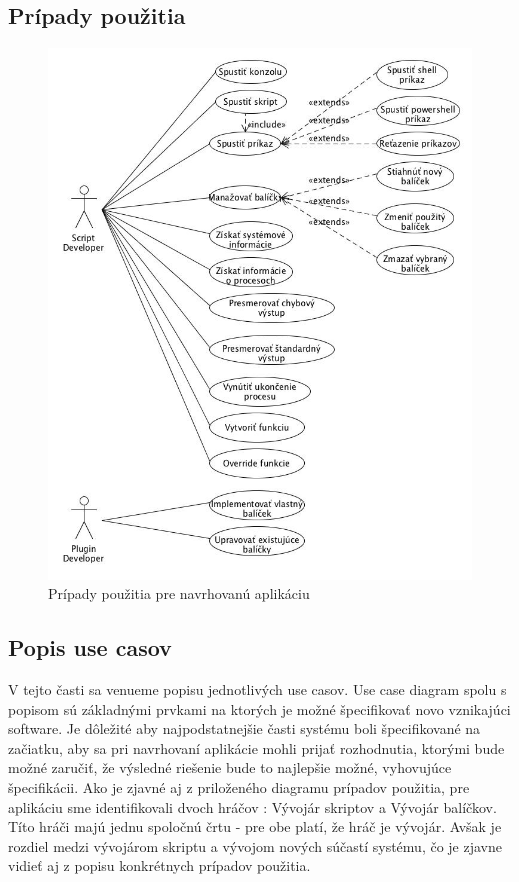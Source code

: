 \subsection{Prípady použitia}
\begin{figure}[!htbp]
	\centering
	\includegraphics[scale=0.6]{img/usecase.jpg}
	\caption{Prípady použitia pre navrhovanú aplikáciu}
	\label{fig:test}
\end{figure}
\newpage
\subsection{Popis use casov}
\indent V tejto časti sa venueme popisu jednotlivých use casov. Use case diagram spolu s popisom sú základnými prvkami na ktorých je možné špecifikovať novo vznikajúci software. Je dôležité aby najpodstatnejšie časti systému boli špecifikované na začiatku, aby sa pri navrhovaní aplikácie mohli prijať rozhodnutia, ktorými bude možné zaručiť, že výsledné riešenie bude to najlepšie možné, vyhovujúce špecifikácii. Ako je zjavné aj z priloženého diagramu prípadov použitia, pre aplikáciu sme identifikovali dvoch hráčov : Vývojár skriptov a Vývojár balíčkov. Títo hráči majú jednu spoločnú črtu - pre obe platí, že hráč je vývojár. Avšak je rozdiel medzi vývojárom skriptu a vývojom nových súčastí systému, čo je zjavne vidieť aj z popisu konkrétnych prípadov použitia.

